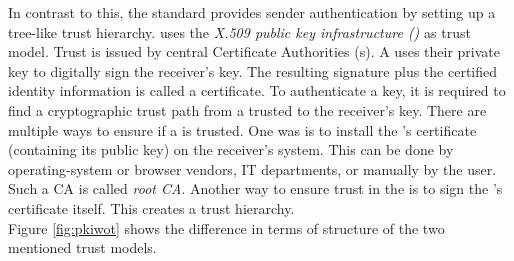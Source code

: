 In contrast to this, the  standard \citep{RFC5751} provides sender authentication by setting up a tree-like trust hierarchy.  uses the \textit{X.509 public key infrastructure ()} \citep{RFC5280} as trust model. Trust is issued by central Certificate Authorities (s). A  uses their private key to digitally sign the receiver's key. The resulting signature plus the certified identity information is called a certificate. To authenticate a key, it is required to find a cryptographic trust path from a trusted  to the receiver's key. There are multiple ways to ensure if a  is trusted. One was is to install the 's certificate (containing its public key) on the receiver's system. This can be done by operating-system or browser vendors, IT departments, or manually by the user. Such a CA is called \textit{root CA}. Another way to ensure trust in the  is to sign the 's certificate itself. This creates a trust hierarchy. \\

Figure \ref{fig:pkiwot} shows the difference in terms of structure of the two mentioned trust models.

